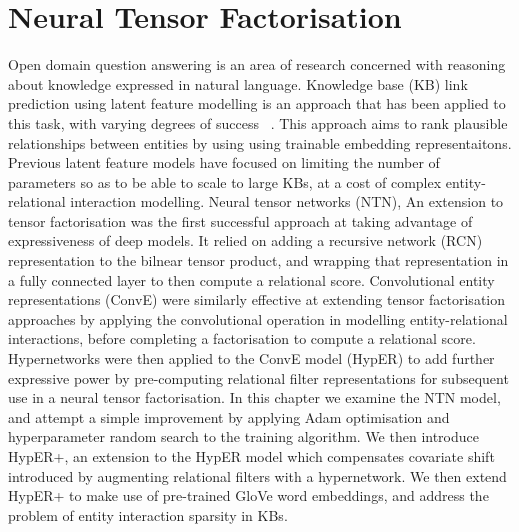\chapter{Neural Tensor Factorisation}


\ifpdf
    \graphicspath{{Chapter3/Figs/Raster/}{Chapter3/Figs/PDF/}{Chapter3/Figs/}}
\else
    \graphicspath{{Chapter3/Figs/Vector/}{Chapter3/Figs/}}
\fi


Open domain question answering is an area of research concerned with reasoning about knowledge expressed in natural language. Knowledge base (KB) link prediction using latent feature modelling is an approach that has been applied to this task, with varying degrees of success  ~\citep{nguyen2017novel, diefenbach2018wdaqua, kristiadi2019incorporating}. This approach aims to rank plausible relationships between entities by using using trainable embedding representaitons. Previous latent feature models have focused on limiting the number of parameters so as to be able to scale to large KBs, at a cost of complex entity-relational interaction modelling. \newline
Neural tensor networks (NTN), An extension to tensor factorisation was the first successful approach at taking advantage of expressiveness of deep models. It relied on adding a recursive network (RCN) representation to the bilnear tensor product, and wrapping that representation in a fully connected layer to then compute a relational score. Convolutional entity representations (ConvE) were similarly effective at extending tensor factorisation approaches by applying the convolutional operation in modelling entity-relational interactions, before completing a factorisation to compute a relational score. Hypernetworks were then applied to the ConvE model (HypER) to add further expressive power by pre-computing relational filter representations for subsequent use in a neural tensor factorisation. \newline
In this chapter we examine the NTN model, and attempt a simple improvement by applying Adam optimisation and hyperparameter random search to the training algorithm. We then introduce HypER+, an extension to the HypER model which compensates covariate shift introduced by augmenting relational filters with a hypernetwork. We then extend HypER+ to make use of pre-trained GloVe word embeddings, and address the problem of entity interaction sparsity in KBs.


